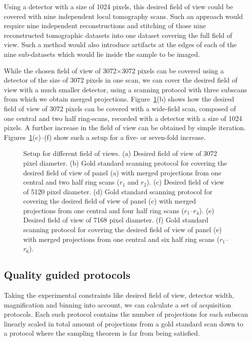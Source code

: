 Using a detector with a size of 1024 pixels, this desired field of view could be covered with nine independent local tomography scans. Such an approach would require nine independent reconstructions and stitching of those nine reconstructed tomographic datasets into one dataset covering the full field of view. Such a method would also introduce artifacts at the edges of each of the nine sub-datasets which would lie inside the sample to be imaged.

While the chosen field of view of 3072$\times$3072 pixels can be covered using a detector of the size of 3072 pixels in one scan, we can cover the desired field of view with a much smaller detector, using a scanning protocol with three subscans from which we obtain merged projections. Figure~\ref{fig:SubScan-Setup}(b) shows how the desired field of view of 3072 pixels can be covered with a wide-field scan, composed of one central and two half ring-scans, recorded with a detector with a size of 1024 pixels. A further increase in the field of view can be obtained by simple iteration. Figures~\ref{fig:SubScan-Setup}(c)--(f) show such a setup for a five- or seven-fold increase.

\begin{figure}
	\centering
	\caption{Setup for different field of views. %
		(a) Desired field of view of 3072 pixel diameter. %
		(b) Gold standard scanning protocol for covering the desired field of view of panel (a) with merged projections from one central and two half ring scans ($r_{1}$ and $r_{2}$). %
		(c) Desired field of view of 5120 pixel diameter. %
		(d) Gold standard scanning protocol for covering the desired field of view of panel (c) with merged projections from one central and four half ring scans ($r_{1}$--$r_{4}$). %
		(e) Desired field of view of 7168 pixel diameter. %
		(f) Gold standard scanning protocol for covering the desired field of view of panel (e) with merged projections from one central and six half ring scans ($r_{1}$--$r_{6}$).}%
	\ifiucr		
		
	\else
	\fi
	\label{fig:SubScan-Setup}
\end{figure}

\subsection{Quality guided protocols}\label{sec:quality guided protocols}
Taking the experimental constraints like desired field of view, detector width, magnification and binning into account, we can calculate a set of acquisition protocols. Each such protocol contains the number of projections for each subscan linearly scaled in total amount of projections from a gold standard scan down to a protocol where the sampling theorem is far from being satisfied.

